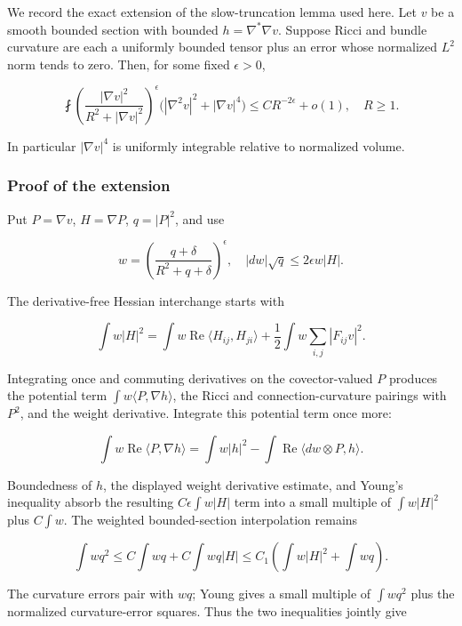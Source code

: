 We record the exact extension of the slow-truncation lemma used here.
Let \(v\) be a smooth bounded section with bounded
\(h=\nabla^*\nabla v\). Suppose Ricci and bundle curvature are each a
uniformly bounded tensor plus an error whose normalized \(L^2\) norm
tends to zero. Then, for some fixed \(\epsilon>0\),

\[
 \fint\left(\frac{|\nabla v|^2}{R^2+|\nabla v|^2}\right)^\epsilon
       \bigl(|\nabla^2v|^2+|\nabla v|^4\bigr)
 \le CR^{-2\epsilon}+o(1),\quad R\ge1.
\tag{14}
\]

In particular \(|\nabla v|^4\) is uniformly integrable relative to
normalized volume.

\hypertarget{o10critical:proof-of-the-extension}{%
\subsubsection{Proof of the extension}\label{o10critical:proof-of-the-extension}}

Put \(P=\nabla v\), \(H=\nabla P\), \(q=|P|^2\), and use

\[
 w=\left(\frac{q+\delta}{R^2+q+\delta}\right)^\epsilon,
 \quad |dw|\sqrt q\le2\epsilon w|H|.
\]

The derivative-free Hessian interchange starts with

\[
 \int w|H|^2
 =\int w\operatorname{Re}\langle H_{ij},H_{ji}\rangle
      +\frac12\int w\sum_{i,j}|F_{ij}v|^2.
\]

Integrating once and commuting derivatives on the covector-valued \(P\)
produces the potential term \(\int w\langle P,\nabla h\rangle\), the
Ricci and connection-curvature pairings with \(P^2\), and the weight
derivative. Integrate this potential term once more:

\[
 \int w\operatorname{Re}\langle P,\nabla h\rangle
 =\int w|h|^2-\int\operatorname{Re}\langle dw\otimes P,h\rangle.
\tag{15}
\]

Boundedness of \(h\), the displayed weight derivative estimate, and
Young's inequality absorb the resulting \(C\epsilon\int w|H|\) term into
a small multiple of \(\int w|H|^2\) plus \(C\int w\). The weighted
bounded-section interpolation remains

\[
 \int wq^2\le C\int wq+C\int wq|H|
 \le C_1\left(\int w|H|^2+\int wq\right).
\tag{16}
\]

The curvature errors pair with \(wq\); Young gives a small multiple of
\(\int wq^2\) plus the normalized curvature-error squares. Thus the two
inequalities jointly give

